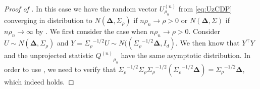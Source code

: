 \documentclass[twoside,letterpaper]{article} \usepackage{aistats2017}
\theoremstyle{definition}
\theoremstyle{remark}
\begin{document}
\begin{proof}[Proof of ]
In this case we have the random vector ${U^{(n)}_{{\rho_n}}}$ from \eqref{eq:UzCDP} converging in distribution to $N(\pmb{\Delta},{{\Sigma}_{{\rho}}})$ if $n \rho_n \to \rho>0$ or $N(\pmb{\Delta},{\Sigma})$ if $n \rho_n \to \infty$ by .  We first consider the case when $n \rho_n \to \rho>0$.  Consider $U \sim N(\pmb{\Delta},{{\Sigma}_{{\rho}}})$ and $Y = {{\Sigma}_{{\rho}}}^{-1/2} U \sim N(({{\Sigma}_{{\rho}}}^{-1/2}\pmb{\Delta},I_d)$.  We then know that $Y^\intercal Y$ and the unprojected statistic ${Q^{({n})}}_{\rho_n}$ have the same asymptotic distribution.  In order to use , we need to verify that ${{\Sigma}_{{\rho}}}^{-1/2}{{\Sigma}_{{\rho}}}{{\Sigma}_{{\rho}}}^{-1/2}\left({{\Sigma}_{{\rho}}}^{-1/2}\pmb{\Delta}\right) = {{\Sigma}_{{\rho}}}^{-1/2}\pmb{\Delta}$, which indeed holds.


\end{proof}
\end{document}
